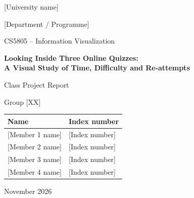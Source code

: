 \documentclass[11pt,a4paper]{article}
\begin{document}
\begin{titlepage}
\centering
\vspace*{1.5cm}
{\large [University name] \par}
{\large [Department / Programme] \par}
\vspace{0.4cm}
{\large CS5805 -- Information Visualization \par}
\vspace{2.2cm}
{\LARGE\bfseries Looking Inside Three Online Quizzes:\\[0.3em]
A Visual Study of Time, Difficulty and Re-attempts \par}
\vspace{0.8cm}
{\large Class Project Report \par}
\vspace{2.5cm}
{\large Group [XX] \par}
\vspace{0.5cm}
\begin{tabular}{ll}
\toprule
\textbf{Name} & \textbf{Index number} \\
\midrule
{[Member 1 name]} & {[Index number]} \\
{[Member 2 name]} & {[Index number]} \\
{[Member 3 name]} & {[Index number]} \\
{[Member 4 name]} & {[Index number]} \\
\bottomrule
\end{tabular}
\vfill
{\large November 2026 \par}
\end{titlepage}
\end{document}
